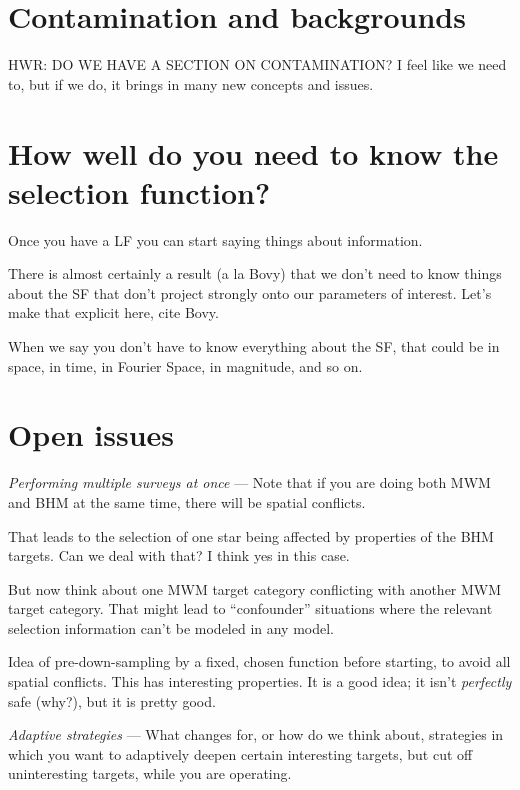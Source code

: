 \documentclass[modern]{aastex62}
\renewcommand{\paragraph}[1]{\medskip\noindent\textit{#1} ---}
\begin{document}
\section{Contamination and backgrounds}\label{sec:bg}

HWR: DO WE HAVE A SECTION ON CONTAMINATION? I feel like we need to,
but if we do, it brings in many new concepts and issues.

\section{How well do you need to know the selection function?}\label{sec:quality}

Once you have a LF you can start saying things about information.

There is almost certainly a result (a la Bovy) that we don't need to know
things about the SF that don't project strongly onto our parameters of interest.
Let's make that explicit here, cite Bovy.

When we say you don't have to know everything about the SF, that could be
in space, in time, in Fourier Space, in magnitude, and so on.

\section{Open issues}

\paragraph{Performing multiple surveys at once}
Note that if you are doing both MWM and BHM at the same time, there will be
spatial conflicts.

That leads to the selection of one star being affected by properties of the
BHM targets. Can we deal with that? I think yes in this case.

But now think about one MWM target category conflicting with another MWM target
category. That might lead to ``confounder'' situations where the relevant selection
information can't be modeled in any model.

Idea of pre-down-sampling by a fixed, chosen function before starting, to avoid
all spatial conflicts. This has interesting properties. It is a good idea; it isn't
\emph{perfectly} safe (why?), but it is pretty good.

\paragraph{Adaptive strategies}
What changes for, or how do we think about, strategies in which you want to
adaptively deepen certain interesting targets, but cut off uninteresting targets,
while you are operating.
\end{document}
